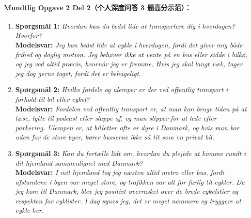 \paragraph*{Mundtlig Opgave 2 Del 2（个人深度问答 3 题高分示范）：}
\begin{enumerate}
  \item \textbf{Spørgsmål 1:} \textit{Hvordan kan du bedst lide at transportere dig i hverdagen? Hvorfor?}\\
  \textbf{Modelsvar:} \textit{Jeg kan bedst lide at cykle i hverdagen, fordi det giver mig både frihed og daglig motion. Jeg behøver ikke at vente på en bus eller sidde i bilkø, og jeg ved altid præcis, hvornår jeg er fremme. Hvis jeg skal langt væk, tager jeg dog gerne toget, fordi det er behageligt.}
  \item \textbf{Spørgsmål 2:} \textit{Hvilke fordele og ulemper er der ved offentlig transport i forhold til bil eller cykel?}\\
  \textbf{Modelsvar:} \textit{Fordelen ved offentlig transport er, at man kan bruge tiden på at læse, lytte til podcast eller slappe af, og man slipper for at lede efter parkering. Ulempen er, at billetter ofte er dyre i Danmark, og hvis man bor uden for de store byer, kører busserne ikke så tit som en privat bil.}
  \item \textbf{Spørgsmål 3:} \textit{Kan du fortælle lidt om, hvordan du plejede at komme rundt i dit hjemland sammenlignet med Danmark?}\\
  \textbf{Modelsvar:} \textit{I mit hjemland tog jeg næsten altid metro eller bus, fordi afstandene i byen var meget store, og trafikken var alt for farlig til cykler. Da jeg kom til Danmark, blev jeg positivt overrasket over de brede cykelstier og respekten for cyklister. I dag synes jeg, det er meget nemmere og tryggere at cykle her.}
\end{enumerate}
